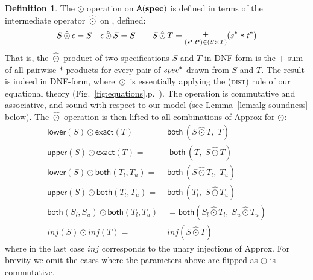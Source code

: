 \documentclass[9pt]{sigplanconf}
\newcounter{block}
\theoremstyle{definition}
\newtheorem{definition}[block]{Definition}
\newcommand{\term}[1]{\texttt{#1}}
\newcommand{\trule}[1]{{\footnotesize{#1}}}
\begin{document}
\begin{definition} The $\odot$ operation on $\textsf{A}(\textbf{spec}{})$
  is defined in terms of the intermediate operator $\hat{\odot}$ on
  \specDNF{}, defined:
\begin{align*}
S \,\hat{\odot}\, \epsilon = S \quad
\epsilon \,\hat{\odot}\, S = S \qquad
S \,\hat{\odot}\, T = \bplus_{(\tyProd{s}, \tyProd{t}) \in (S \times
   T)} (\tyProd{s} \; \term{*} \; \tyProd{t})
\end{align*}
That is, the $\hat{\odot}$ product of two specifications $S$ and $T$ in DNF form 
is the $\term{+}$ sum of all pairwise $\term{*}$ products for every
pair of $\tyProd{spec}$ drawn from $S$ and $T$. The result
is indeed in DNF-form, where $\hat{\odot}$ is essentially applying
 the (\trule{\textsc{dist}}) rule of our equational theory
 (Fig.~\ref{fig:equations},p.~\pageref{fig:equations}). The operation is
commutative and associative, and sound with respect to our
model (see Lemma~\ref{lem:alg-soundness} below).
The $\hat{\odot}$ operation is then lifted to all combinations of
\textsf{Approx} for $\odot$:
\begin{align*}
\textsf{lower}(S) \odot \textsf{exact}(T) = \; &
       \textsf{both} \, (S \hat{\odot} T, \; T) \\
\textsf{upper}(S) \odot \textsf{exact}(T) = \; & 
      \; \textsf{both} \, (T, \; S \hat{\odot} T) \\
\textsf{lower}(S) \odot \textsf{both}(T_l,T_u) = \; &
        \textsf{both} \, (S \hat{\odot} T_l, \; T_u) \\
\textsf{upper}(S) \odot \textsf{both}(T_l,T_u) = \; & \textsf{both} \,
                                                      (T_l, \; S \hat{\odot} T_u) \\
\textsf{both}(S_l,S_u) \odot
\textsf{both}(T_l,T_u) & = \textsf{both} (S_l \hat{\odot} T_l, \; S_u
                         \hat{\odot} T_u) \\
\textit{inj}(S) \odot \textit{inj}(T) = \; & \textit{inj}(S
                                              \hat{\odot} T)
\end{align*}
where in the last case $\textit{inj}$ corresponds to the unary
injections of \textsf{Approx}. For brevity we omit the cases where the parameters above are flipped
as $\odot$ is commutative.
\end{definition}
\end{document}
